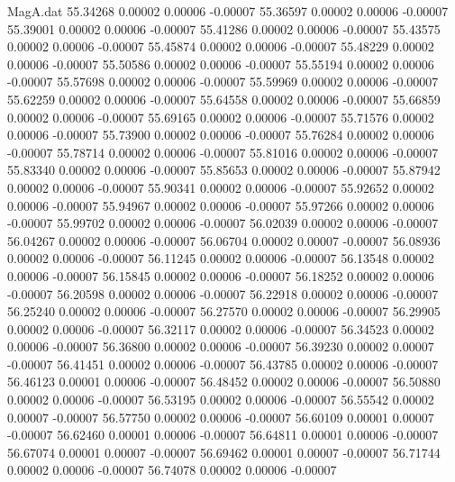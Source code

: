 \begin{filecontents}{MagA.dat}
  55.34268    0.00002    0.00006   -0.00007
  55.36597    0.00002    0.00006   -0.00007
  55.39001    0.00002    0.00006   -0.00007
  55.41286    0.00002    0.00006   -0.00007
  55.43575    0.00002    0.00006   -0.00007
  55.45874    0.00002    0.00006   -0.00007
  55.48229    0.00002    0.00006   -0.00007
  55.50586    0.00002    0.00006   -0.00007
  55.55194    0.00002    0.00006   -0.00007
  55.57698    0.00002    0.00006   -0.00007
  55.59969    0.00002    0.00006   -0.00007
  55.62259    0.00002    0.00006   -0.00007
  55.64558    0.00002    0.00006   -0.00007
  55.66859    0.00002    0.00006   -0.00007
  55.69165    0.00002    0.00006   -0.00007
  55.71576    0.00002    0.00006   -0.00007
  55.73900    0.00002    0.00006   -0.00007
  55.76284    0.00002    0.00006   -0.00007
  55.78714    0.00002    0.00006   -0.00007
  55.81016    0.00002    0.00006   -0.00007
  55.83340    0.00002    0.00006   -0.00007
  55.85653    0.00002    0.00006   -0.00007
  55.87942    0.00002    0.00006   -0.00007
  55.90341    0.00002    0.00006   -0.00007
  55.92652    0.00002    0.00006   -0.00007
  55.94967    0.00002    0.00006   -0.00007
  55.97266    0.00002    0.00006   -0.00007
  55.99702    0.00002    0.00006   -0.00007
  56.02039    0.00002    0.00006   -0.00007
  56.04267    0.00002    0.00006   -0.00007
  56.06704    0.00002    0.00007   -0.00007
  56.08936    0.00002    0.00006   -0.00007
  56.11245    0.00002    0.00006   -0.00007
  56.13548    0.00002    0.00006   -0.00007
  56.15845    0.00002    0.00006   -0.00007
  56.18252    0.00002    0.00006   -0.00007
  56.20598    0.00002    0.00006   -0.00007
  56.22918    0.00002    0.00006   -0.00007
  56.25240    0.00002    0.00006   -0.00007
  56.27570    0.00002    0.00006   -0.00007
  56.29905    0.00002    0.00006   -0.00007
  56.32117    0.00002    0.00006   -0.00007
  56.34523    0.00002    0.00006   -0.00007
  56.36800    0.00002    0.00006   -0.00007
  56.39230    0.00002    0.00007   -0.00007
  56.41451    0.00002    0.00006   -0.00007
  56.43785    0.00002    0.00006   -0.00007
  56.46123    0.00001    0.00006   -0.00007
  56.48452    0.00002    0.00006   -0.00007
  56.50880    0.00002    0.00006   -0.00007
  56.53195    0.00002    0.00006   -0.00007
  56.55542    0.00002    0.00007   -0.00007
  56.57750    0.00002    0.00006   -0.00007
  56.60109    0.00001    0.00007   -0.00007
  56.62460    0.00001    0.00006   -0.00007
  56.64811    0.00001    0.00006   -0.00007
  56.67074    0.00001    0.00007   -0.00007
  56.69462    0.00001    0.00007   -0.00007
  56.71744    0.00002    0.00006   -0.00007
  56.74078    0.00002    0.00006   -0.00007

\end{filecontents}
